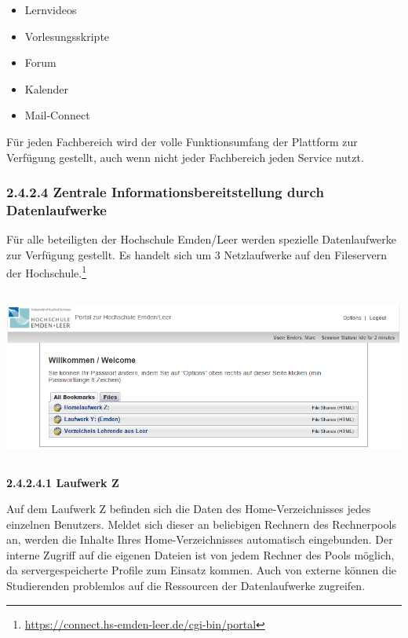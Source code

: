 \documentclass[a4paper]{article}
\makeatletter
\newcommand\textstyleAbsatzStandardschriftart[1]{#1}
\newcommand\liststyleLiii{%
\renewcommand\labelitemi{{\textbullet}}
\renewcommand\labelitemii{o}
\renewcommand\labelitemiii{${\blacksquare}$}
\renewcommand\labelitemiv{{\textbullet}}
}
\newcommand\captionof[1]{\def\@captype{#1}\caption}
\makeatother
\begin{document}
\bigskip

\liststyleLiii
\begin{itemize}
\item {\sffamily\color{black}
\textstyleAbsatzStandardschriftart{Lernvideos}}
\item {\sffamily\color{black}
\textstyleAbsatzStandardschriftart{Vorlesungsskripte}}
\item {\sffamily\color{black}
\textstyleAbsatzStandardschriftart{Forum}}
\item {\sffamily\color{black}
\textstyleAbsatzStandardschriftart{Kalender}}
\item {\sffamily\color{black}
\textstyleAbsatzStandardschriftart{Mail-Connect}}
\end{itemize}
{\sffamily\mdseries\color{black}
\textstyleAbsatzStandardschriftart{Für jeden Fachbereich wird der volle Funktionsumfang der Plattform zur Verfügung
gestellt, auch wenn nicht jeder Fachbereich jeden Service nutzt. }}


\bigskip

\subsubsection{2.4.2.4 Zentrale Informationsbereitstellung durch Datenlaufwerke}
{\sffamily\mdseries\color{black}
Für alle beteiligten der Hochschule Emden/Leer werden spezielle Datenlaufwerke zur Verfügung gestellt. Es handelt sich
um 3 Netzlaufwerke auf den Fileservern der Hochschule.\footnote{\url{https://connect.hs-emden-leer.de/cgi-bin/portal}}}

\includegraphics[width=15.501cm,height=5.667cm]{EntwurfKapitel2Gruppe220150528VW-img/EntwurfKapitel2Gruppe220150528VW-img007.png}
\captionof{figure}[Zugriff auf die Datenlaufwerke von extern]{Zugriff auf die Datenlaufwerke von extern}


{\sffamily\bfseries\color{black}
2.4.2.4.1 Laufwerk Z}

{\sffamily\mdseries\color{black}
\textstyleAbsatzStandardschriftart{Auf dem Laufwerk Z befinden sich die Daten des Home-Verzeichnisses jedes einzelnen
Benutzers. Meldet sich dieser an beliebigen Rechnern des Rechnerpools an, werden die Inhalte Ihres Home-Verzeichnisses
automatisch\textcolor[rgb]{0.4392157,0.1882353,0.627451}{ }eingebunden. Der interne Zugriff auf die eigenen Dateien ist
von jedem Rechner des Pools möglich, da servergespeicherte Profile zum Einsatz kommen. Auch von externe können die
Studierenden problemlos auf die Ressourcen der Datenlaufwerke zugreifen.}}
\end{document}

